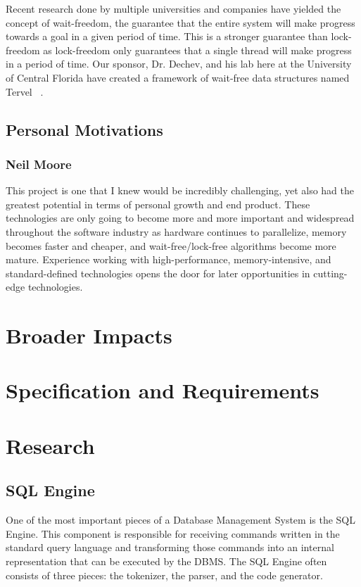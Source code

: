 \documentclass[letterpaper]{article}
\begin{document}

Recent research done by multiple universities and companies have yielded the concept of wait-freedom,
the guarantee that the entire system will make progress towards a goal in a given period of time.
This is a stronger guarantee than lock-freedom as lock-freedom only guarantees that a single thread
will make progress in a period of time. Our sponsor, Dr. Dechev, and his lab here at the University
of Central Florida have created a framework of wait-free data structures named Tervel ~\cite{tervel}.

\subsection{Personal Motivations}
\subsubsection{Neil Moore}
This project is one that I knew would be incredibly challenging, yet also had the greatest
potential in terms of personal growth and end product. These technologies are only going to
become more and more important and widespread throughout the software industry as hardware 
continues to parallelize, memory becomes faster and cheaper, and wait-free/lock-free algorithms
become more mature. Experience working with high-performance, memory-intensive, and
standard-defined technologies opens the door for later opportunities in cutting-edge technologies.
\newpage

\section{Broader Impacts}
\newpage

\section{Specification and Requirements}
\newpage

\section{Research}
\subsection{SQL Engine}
One of the most important pieces of a Database Management System is the SQL Engine. 
This component is responsible for receiving commands written in the standard query
language and transforming those commands into an internal representation that can be
executed by the DBMS. The SQL Engine often consists of three pieces: the tokenizer, the
parser, and the code generator.
\end{document}
